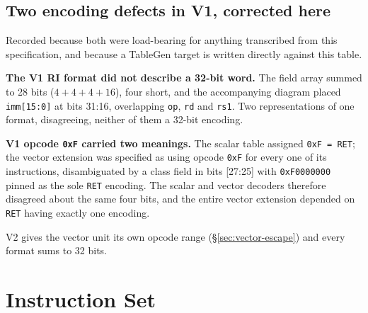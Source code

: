 \documentclass[11pt,a4paper]{article}
\begin{document}
\subsection{Two encoding defects in V1, corrected here}
\label{sec:v1-encoding-defects}

Recorded because both were load-bearing for anything transcribed from this
specification, and because a TableGen target is written directly against this
table.

\textbf{The V1 RI format did not describe a 32-bit word.} The field array
summed to 28 bits ($4 + 4 + 4 + 16$), four short, and the accompanying diagram
placed \texttt{imm[15:0]} at bits 31:16, overlapping \texttt{op}, \texttt{rd}
and \texttt{rs1}. Two representations of one format, disagreeing, neither of
them a 32-bit encoding.

\textbf{V1 opcode \texttt{0xF} carried two meanings.} The scalar table assigned
\texttt{0xF = RET}; the vector extension was specified as using opcode
\texttt{0xF} for every one of its instructions, disambiguated by a class field
in bits [27:25] with \texttt{0xF0000000} pinned as the sole \texttt{RET}
encoding. The scalar and vector decoders therefore disagreed about the same
four bits, and the entire vector extension depended on \texttt{RET} having
exactly one encoding.

V2 gives the vector unit its own opcode range (\S\ref{sec:vector-escape}) and
every format sums to 32 bits.

\newpage

\section{Instruction Set}
\end{document}
